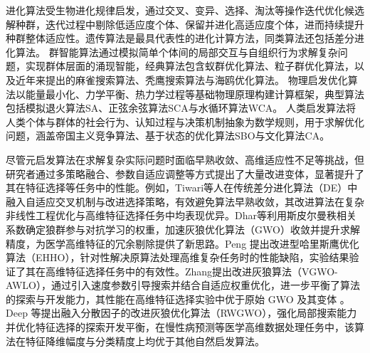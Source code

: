 \documentclass{wzuthesis}
\begin{document}
进化算法受生物进化规律启发，通过交叉、变异、选择、淘汰等操作迭代优化候选解种群，迭代过程中剔除低适应度个体、保留并进化高适应度个体，进而持续提升种群整体适应性。遗传算法是最具代表性的进化计算方法，同类算法还包括差分进化算法。
群智能算法通过模拟简单个体间的局部交互与自组织行为求解复杂问题，实现群体层面的涌现智能，经典算法包含蚁群优化算法、粒子群优化算法，以及近年来提出的麻雀搜索算法、秃鹰搜索算法与海鸥优化算法。
物理启发优化算法以能量最小化、力学平衡、热力学过程等基础物理原理构建计算框架，典型算法包括模拟退火算法SA、正弦余弦算法SCA与水循环算法WCA。
人类启发算法将人类个体与群体的社会行为、认知过程与决策机制抽象为数学规则，用于求解优化问题，涵盖帝国主义竞争算法、基于状态的优化算法SBO与文化算法CA。

尽管元启发算法在求解复杂实际问题时面临早熟收敛、高维适应性不足等挑战，但研究者通过多策略融合、参数自适应调整等方式提出了大量改进变体，显著提升了其在特征选择等任务中的性能。例如，Tiwari等人在传统差分进化算法（DE）中融入自适应交叉机制与改进选择策略，有效避免算法早熟收敛，其改进算法在复杂非线性工程优化与高维特征选择任务中均表现优异。Dhar等利用斯皮尔曼秩相关系数确定狼群参与对抗学习的权重，加速灰狼优化算法（GWO）收敛并提升求解精度，为医学高维特征的冗余剔除提供了新思路。Peng 提出改进型哈里斯鹰优化算法（EHHO），针对性解决原算法处理高维复杂任务时的性能缺陷，实验结果验证了其在高维特征选择任务中的有效性。Zhang提出改进灰狼算法（VGWO-AWLO），通过引入速度参数引导搜索并结合自适应权重优化，进一步平衡了算法的探索与开发能力，其性能在高维特征选择实验中优于原始 GWO 及其变体 。Deep 等提出融入分散因子的改进灰狼优化算法（RWGWO），强化局部搜索能力并优化特征选择的探索开发平衡，在慢性病预测等医学高维数据处理任务中，该算法在特征降维幅度与分类精度上均优于其他自然启发算法。
\end{document}
